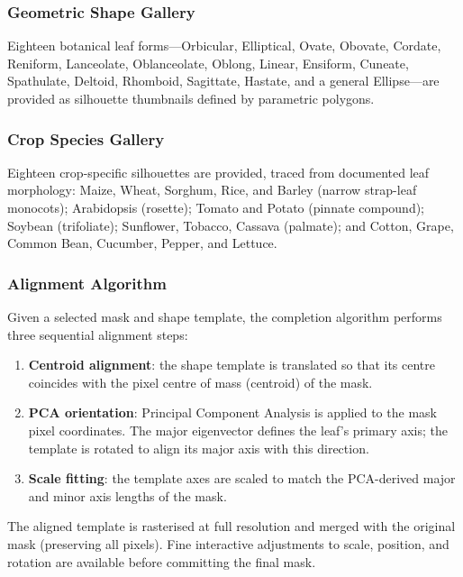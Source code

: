\documentclass[12pt, a4paper]{article}
\begin{document}
\subsubsection{Geometric Shape Gallery}

Eighteen botanical leaf forms—Orbicular, Elliptical, Ovate, Obovate, Cordate, Reniform, Lanceolate, Oblanceolate, Oblong, Linear, Ensiform, Cuneate, Spathulate, Deltoid, Rhomboid, Sagittate, Hastate, and a general Ellipse—are provided as silhouette thumbnails defined by parametric polygons.

\subsubsection{Crop Species Gallery}

Eighteen crop-specific silhouettes are provided, traced from documented leaf morphology: Maize, Wheat, Sorghum, Rice, and Barley (narrow strap-leaf monocots); Arabidopsis (rosette); Tomato and Potato (pinnate compound); Soybean (trifoliate); Sunflower, Tobacco, Cassava (palmate); and Cotton, Grape, Common Bean, Cucumber, Pepper, and Lettuce.

\subsubsection{Alignment Algorithm}

Given a selected mask and shape template, the completion algorithm performs
three sequential alignment steps:

\begin{enumerate}
    \item \textbf{Centroid alignment}: the shape template is translated so that
          its centre coincides with the pixel centre of mass (centroid) of the
          mask.
    \item \textbf{PCA orientation}: Principal Component Analysis is applied to
          the mask pixel coordinates.  The major eigenvector defines the leaf's
          primary axis; the template is rotated to align its major axis with
          this direction.
    \item \textbf{Scale fitting}: the template axes are scaled to match the
          PCA-derived major and minor axis lengths of the mask.
\end{enumerate}

The aligned template is rasterised at full resolution and merged with the original mask (preserving all pixels). Fine interactive adjustments to scale, position, and rotation are available before committing the final mask.
\end{document}
